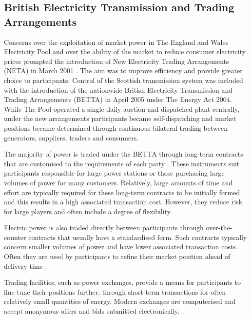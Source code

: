 \subsection{British Electricity Transmission and Trading Arrangements}
\label{sec:betta}
Concerns over the exploitation of market power in The England and Wales
Electricity Pool and over the ability of the market to reduce consumer
electricity prices prompted the introduction of New Electricity Trading
Arrangements (NETA) in March 2001 \cite{martoccia:2005}.  The aim was to improve
efficiency and provide greater choice to participants.  Control of the Scottish
transmission system was included with the introduction of the nationwide British
Electricity Transmission and Trading Arrangements (BETTA) in April 2005 under
The Energy Act 2004.  While The Pool operated a single daily auction and
dispatched plant centrally, under the new arrangements participants became
self-dispatching and market positions became determined through continuous
bilateral trading between generators, suppliers, traders and consumers.

The majority of power is traded under the BETTA through long-term contracts that
are customised to the requirements of each party \cite{kirschen:book}. These
instruments suit participants responsible for large power stations or those
purchasing large volumes of power for many customers.  Relatively, large
amounts of time and effort are typically required for these long-term contracts to be initially
formed and this results in a high associated transaction cost. However, they
reduce risk for large players and often include a degree of flexibility.

Electric power is also traded directly between participants through
over-the-counter contracts that usually have a standardised form.  Such
contracts typically concern smaller volumes of power and have lower
associated transaction costs.  Often they are used by participants to refine
their market position ahead of delivery time \cite{kirschen:book}.

Trading facilities, such as power exchanges, provide a means for participants
to fine-tune their positions further, through short-term transactions for
often relatively small quantities of energy.  Modern exchanges are
computerised and accept anonymous offers and bids submitted electronically.

